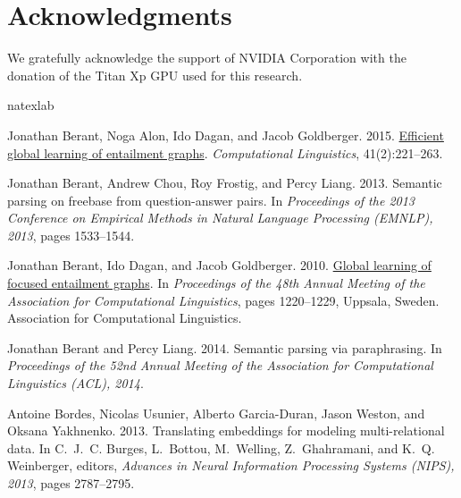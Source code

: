\documentclass[11pt,a4paper]{article}
\begin{document}
\section*{Acknowledgments}

We gratefully acknowledge the support of NVIDIA Corporation with the donation of the Titan Xp GPU used for this research. \\

\begin{thebibliography}{29}
\expandafter\ifx\csname natexlab\endcsname\relax\def\natexlab#1{#1}\fi

Jonathan Berant, Noga Alon, Ido Dagan, and Jacob Goldberger. 2015.
\newblock \href {https://doi.org/10.1162/COLI_a_00220} {Efficient global
  learning of entailment graphs}.
\newblock \emph{Computational Linguistics}, 41(2):221--263.

Jonathan Berant, Andrew Chou, Roy Frostig, and Percy Liang. 2013.
\newblock Semantic parsing on freebase from question-answer pairs.
\newblock In \emph{Proceedings of the 2013 Conference on Empirical Methods in
  Natural Language Processing (EMNLP), 2013}, pages 1533--1544.

Jonathan Berant, Ido Dagan, and Jacob Goldberger. 2010.
\newblock \href {https://www.aclweb.org/anthology/P10-1124} {Global learning of
  focused entailment graphs}.
\newblock In \emph{Proceedings of the 48th Annual Meeting of the Association
  for Computational Linguistics}, pages 1220--1229, Uppsala, Sweden.
  Association for Computational Linguistics.

Jonathan Berant and Percy Liang. 2014.
\newblock Semantic parsing via paraphrasing.
\newblock In \emph{Proceedings of the 52nd Annual Meeting of the Association
  for Computational Linguistics (ACL), 2014}.

Antoine Bordes, Nicolas Usunier, Alberto Garcia-Duran, Jason Weston, and Oksana
  Yakhnenko. 2013.
\newblock Translating embeddings for modeling multi-relational data.
\newblock In C.~J.~C. Burges, L.~Bottou, M.~Welling, Z.~Ghahramani, and K.~Q.
  Weinberger, editors, \emph{Advances in Neural Information Processing Systems
  (NIPS), 2013}, pages 2787--2795.


\end{thebibliography}
\end{document}
